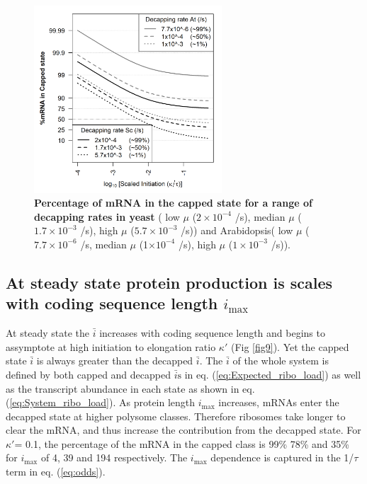 \documentclass[10pt,letterpaper]{article}
\newcommand{\imax}{\ensuremath{{i_{\max}}}\xspace}
\newcommand{\MRL}{\ensuremath{\bar{i}}\xspace}
\newcommand{\MRLs}{\ensuremath{\bar{i}\text{s}}\xspace}
\begin{document}
\begin{figure}[!h]
\begin{center}
\includegraphics[width=70mm]{Images/2023-07-28_logodds.png}
\caption{{\bf Percentage of mRNA in the capped state for a range of decapping rates in yeast} ( low $\mu$ ($2\times 10^{-4}$ /s), median $\mu$ ($1.7\times 10^{-3}$ /s), high $\mu$ ($5.7\times 10^{-3}$ /s)) and Arabidopsis( low $\mu$ ($7.7\times 10^{-6}$ /s, median $\mu$ (1$\times 10^{-4}$ /s), high $\mu$ ($1\times 10^{-3}$ /s)). }
\label{fig8}
\end{center}
\end{figure}

\subsection*{At steady state protein production is scales with coding sequence length \imax}
At steady state the \MRL increases with coding sequence length and begins to assymptote at high initiation to elongation ratio $\kappa'$ (Fig \ref{fig9}). Yet the capped state \MRL is always greater than the decapped \MRL. The \MRL of the whole system is defined by both capped and decapped \MRLs in eq. (\ref{eq:Expected_ribo_load}) as well as the transcript abundance in each state as shown in eq. (\ref{eq:System_ribo_load}).
As protein length \imax increases, mRNAs enter the decapped state at higher polysome classes. 
Therefore ribosomes take longer  to clear the mRNA, and thus increase the contribution from the decapped state. 
For $\kappa'$= 0.1, the percentage of the mRNA in the capped class is  99\% 78\%  and 35\% for \imax of 4, 39 and 194 respectively.
The \imax dependence is captured in the 1/$\tau$ term in eq. (\ref{eq:odds}).
  
\end{document}
